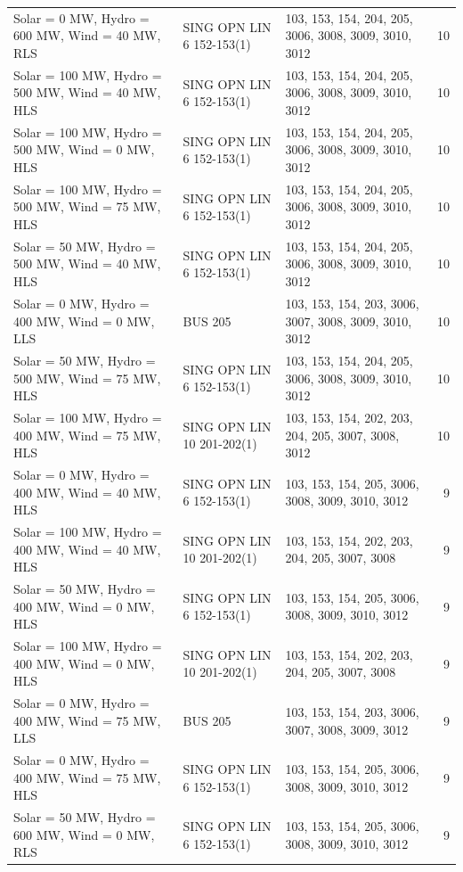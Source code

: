 \documentclass[10pt]{report}
\begin{document}
\begin{table}[H]
{\begin{tabular}{llp{9cm}r}
Solar = 0 MW, Hydro = 600 MW, Wind = 40 MW, RLS & SING OPN LIN   6 152-153(1) & 103, 153, 154, 204, 205, 3006, 3008, 3009, 3010, 3012 & 10 \\
Solar = 100 MW, Hydro = 500 MW, Wind = 40 MW, HLS & SING OPN LIN   6 152-153(1) & 103, 153, 154, 204, 205, 3006, 3008, 3009, 3010, 3012 & 10 \\
Solar = 100 MW, Hydro = 500 MW, Wind = 0 MW, HLS & SING OPN LIN   6 152-153(1) & 103, 153, 154, 204, 205, 3006, 3008, 3009, 3010, 3012 & 10 \\
Solar = 100 MW, Hydro = 500 MW, Wind = 75 MW, HLS & SING OPN LIN   6 152-153(1) & 103, 153, 154, 204, 205, 3006, 3008, 3009, 3010, 3012 & 10 \\
Solar = 50 MW, Hydro = 500 MW, Wind = 40 MW, HLS & SING OPN LIN   6 152-153(1) & 103, 153, 154, 204, 205, 3006, 3008, 3009, 3010, 3012 & 10 \\
Solar = 0 MW, Hydro = 400 MW, Wind = 0 MW, LLS & BUS 205 & 103, 153, 154, 203, 3006, 3007, 3008, 3009, 3010, 3012 & 10 \\
Solar = 50 MW, Hydro = 500 MW, Wind = 75 MW, HLS & SING OPN LIN   6 152-153(1) & 103, 153, 154, 204, 205, 3006, 3008, 3009, 3010, 3012 & 10 \\
Solar = 100 MW, Hydro = 400 MW, Wind = 75 MW, HLS & SING OPN LIN   10 201-202(1) & 103, 153, 154, 202, 203, 204, 205, 3007, 3008, 3012 & 10 \\
Solar = 0 MW, Hydro = 400 MW, Wind = 40 MW, HLS & SING OPN LIN   6 152-153(1) & 103, 153, 154, 205, 3006, 3008, 3009, 3010, 3012 & 9 \\
Solar = 100 MW, Hydro = 400 MW, Wind = 40 MW, HLS & SING OPN LIN   10 201-202(1) & 103, 153, 154, 202, 203, 204, 205, 3007, 3008 & 9 \\
Solar = 50 MW, Hydro = 400 MW, Wind = 0 MW, HLS & SING OPN LIN   6 152-153(1) & 103, 153, 154, 205, 3006, 3008, 3009, 3010, 3012 & 9 \\
Solar = 100 MW, Hydro = 400 MW, Wind = 0 MW, HLS & SING OPN LIN   10 201-202(1) & 103, 153, 154, 202, 203, 204, 205, 3007, 3008 & 9 \\
Solar = 0 MW, Hydro = 400 MW, Wind = 75 MW, LLS & BUS 205 & 103, 153, 154, 203, 3006, 3007, 3008, 3009, 3012 & 9 \\
Solar = 0 MW, Hydro = 400 MW, Wind = 75 MW, HLS & SING OPN LIN   6 152-153(1) & 103, 153, 154, 205, 3006, 3008, 3009, 3010, 3012 & 9 \\
Solar = 50 MW, Hydro = 600 MW, Wind = 0 MW, RLS & SING OPN LIN   6 152-153(1) & 103, 153, 154, 205, 3006, 3008, 3009, 3010, 3012 & 9 \\
\bottomrule
\end{tabular}}
\end{table}
\end{document}
